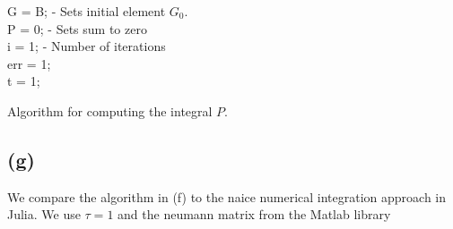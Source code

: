 \begin{algorithm}[H]
 G = B;  - Sets initial element $G_0$.\\
 P = 0; - Sets sum to zero\\
 i = 1; - Number of iterations \\
 err = 1;\\ 
 t = 1;\\
 \caption{Algorithm for computing the integral $P$.}
\end{algorithm}

\subsection*{(g)}
We compare the algorithm in (f) to the naice numerical integration approach in Julia. We use $\tau = 1$ and the neumann matrix from the Matlab library